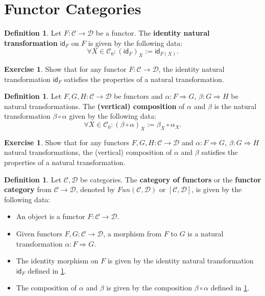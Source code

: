 \documentclass[a4paper,11pt, oneside,titlepage=false]{scrbook}
\theoremstyle{plain}
\theoremstyle{definition}
\newtheorem{dfn}[thm]{Definition}
\newtheorem{exer}[thm]{Exercise}
\newcommand{\cfont}[1]{\ensuremath{\mathsf{#1}}}
\newcommand{\Cat}[1]{\mathcal{#1}}
\newcommand{\CC}{\Cat{C}}
\newcommand{\DD}{\Cat{D}}
\newcommand{\Ob}[1]{{#1}_0}
\newcommand{\Id}[1][]{\cfont{id}_{#1}}
\newcommand{\NatTrans}[3]{#1 : #2 \Rightarrow #3}
\newcommand{\co}[2]{\ensuremath{#2 \circ #1}}
\begin{document}
\section{Functor Categories}

\begin{dfn}\label{dfn:nattrans_id} Let $F:\CC\to\DD$ be a functor. The \textbf{identity natural transformation} $\Id[F]$ on $F$ is given by the following data:
\[
\forall X\in\Ob{\CC}: (\Id[F])_{X} := \Id[F(X)].
\]
\end{dfn}

\begin{exer} Show that for any functor $F:\CC\to\DD$, the identity natural transformation $\Id[F]$ satisfies the properties of a natural transformation.
\end{exer}

\begin{dfn}\label{dfn:nattrans_comp} Let $F,G,H: \CC\to\DD$ be functors and $\NatTrans{\alpha}{F}{G}$, $\NatTrans{\beta}{G}{H}$ be natural transformations. The \textbf{(vertical) composition} of $\alpha$ and $\beta$ is the natural transformation $\co{\alpha}{\beta}$ given by the following data:
\[
\forall X\in\Ob{\CC}: (\co{\alpha}{\beta})_{X} := \co{\alpha_X}{\beta_X}.
\]
\end{dfn}

\begin{exer} Show that for any functors $F,G,H: \CC\to\DD$ and $\NatTrans{\alpha}{F}{G}$, $\NatTrans{\beta}{G}{H}$ natural transformations, the (vertical) composition of $\alpha$ and $\beta$ satisfies the properties of a natural transformation.
\end{exer}

\begin{dfn} Let $\CC,\DD$ be categories. The \textbf{category of functors} or the \textbf{functor category} from $\CC\to\DD$, denoted by $Fun(\CC,\DD)$ or $[\CC,\DD]$, is given by the following data:
\begin{itemize}
\item An object is a functor $F:\CC\to\DD$.
\item Given functors $F, G:\CC\to\DD$, a morphism from $F$ to $G$ is a natural transformation $\NatTrans{\alpha}{F}{G}$.
\item The identity morphism on $F$ is given by the identity natural transformation $\Id[F]$ defined in \cref{dfn:nattrans_id}.
\item The composition of $\alpha$ and $\beta$ is given by the composition $\co{\alpha}{\beta}$ defined in \cref{dfn:nattrans_comp}.
\end{itemize}
\end{dfn}
\end{document}
